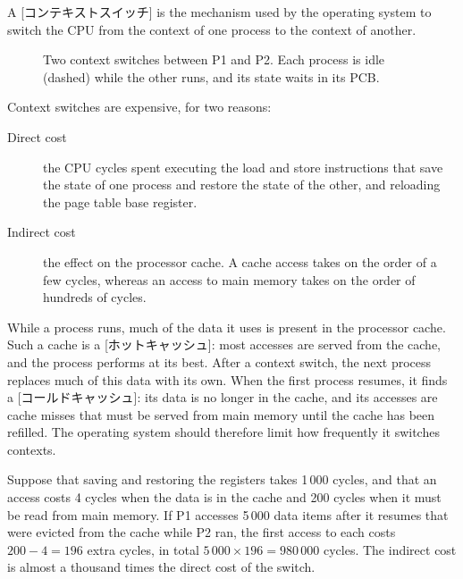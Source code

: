 \documentclass[../main.tex]{subfiles}
\begin{document}
\begin{definition}
  A [コンテキストスイッチ] is the mechanism used by
  the operating system to switch the CPU from the context of one process to
  the context of another.
\end{definition}

\begin{figure}[htbp]
  \centering
  
  \caption{Two context switches between P1 and P2.  Each process is idle
    (dashed) while the other runs, and its state waits in its PCB.}
  \label{fig:l02-context-switch}
\end{figure}

Context switches are expensive, for two reasons:
\begin{description}
  \item[Direct cost] the CPU cycles spent executing the load and store
    instructions that save the state of one process and restore the state
    of the other, and reloading the page table base register.
  \item[Indirect cost] the effect on the processor cache.  A cache access
    takes on the order of a few cycles, whereas an access to main memory
    takes on the order of hundreds of cycles.
\end{description}

While a process runs, much of the data it uses is present in the processor
cache.  Such a cache is a [ホットキャッシュ]: most accesses
are served from the cache, and the process performs at its best.  After a
context switch, the next process replaces much of this data with its own.
When the first process resumes, it finds a
[コールドキャッシュ]: its data is no longer in the cache,
and its accesses are cache misses that must be served from main memory until
the cache has been refilled.  The operating system should
therefore limit how frequently it switches contexts.

\begin{example}
  Suppose that saving and restoring the registers takes 1\,000 cycles, and
  that an access costs 4 cycles when the data is in the cache and 200 cycles
  when it must be read from main memory.  If P1 accesses 5\,000 data items
  after it resumes that were evicted from the cache while P2 ran, the first
  access to each costs $200 - 4 = 196$ extra cycles, in total
  $5\,000\times 196 = 980\,000$ cycles.  The indirect cost is almost a
  thousand times the direct cost of the switch.
\end{example}
\end{document}
